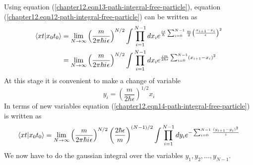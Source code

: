 \begin{enumerate}
	Using equation (\ref{chapter12.eqn13-path-integral-free-particle}), equation (\ref{chapter12.eqn12-path-integral-free-particle}) can be written as
	\begin{align}
		\braket{x t}{x_0 t_0} 
		&= \lim\limits_{N \rightarrow \infty} \left(\frac{m}{2\pi \hbar {i\mkern1mu} \epsilon}\right)^{N/2} \int \prod_{i=1}^{N-1} dx_i e^{\frac{{i\mkern1mu} \epsilon}{\hbar} \sum_{i=0}^{N-1} \frac{m}{2} \left(\frac{x_{i+1} - x_i}{\epsilon}\right)^2} \\
		&= \lim\limits_{N \rightarrow \infty} \left(\frac{m}{2\pi \hbar {i\mkern1mu} \epsilon}\right)^{N/2} \int \prod_{i=1}^{N-1} dx_i e^{\frac{{i\mkern1mu} m}{2\hbar \epsilon} \sum_{i=0}^{N-1} (x_{i+1} - x_i)^2}
		\label{chapter12.eqn14-path-integral-free-particle}
	\end{align}
	At this stage it is convenient to make a change of variable
	\begin{equation}
		y_i = \left(\frac{m}{2\hbar \epsilon}\right)^{1/2} x_i
	\end{equation}
	In terms of new variables equation (\ref{chapter12.eqn14-path-integral-free-particle}) is written as
	\begin{equation}
		\braket{x t}{x_0 t_0} 
		= \lim\limits_{N \rightarrow \infty} \left(\frac{m}{2\pi \hbar {i\mkern1mu} \epsilon}\right)^{N/2} \left(\frac{2\hbar \epsilon}{m}\right)^{(N-1)/2} \int \prod_{i=1}^{N-1} dy_i e^{-\sum_{i=0}^{N-1} \frac{(y_{i+1} - y_i)^2}{i}}
		\label{chapter12.eqn15-path-integral-free-particle}
	\end{equation}
	We now have to do the gaussian integral over the variables $y_1, y_2, \ldots, y_{N-1}$.\\
	

\end{enumerate}
